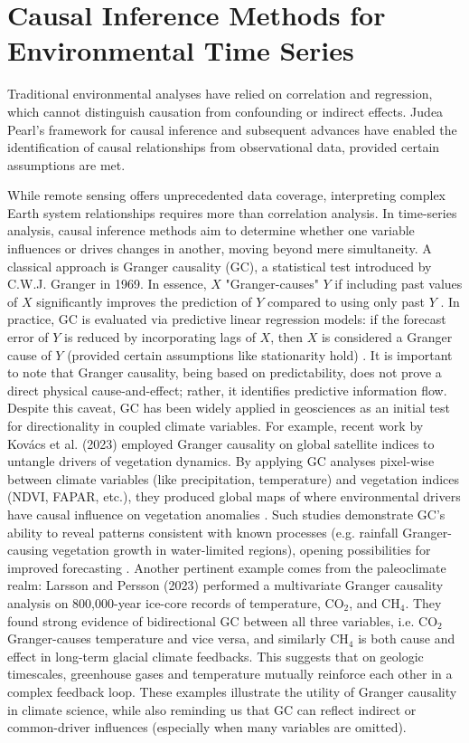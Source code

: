 
\section{Causal Inference Methods for Environmental Time Series}

Traditional environmental analyses have relied on correlation and regression, which cannot distinguish causation from confounding or indirect effects. Judea Pearl's framework for causal inference \cite{Pearl2009} and subsequent advances have enabled the identification of causal relationships from observational data, provided certain assumptions are met.

While remote sensing offers unprecedented data coverage, interpreting complex Earth system relationships requires more than correlation analysis. In time-series analysis, causal inference methods aim to determine whether one variable influences or drives changes in another, moving beyond mere simultaneity. A classical approach is Granger causality (GC), a statistical test introduced by C.W.J. Granger in 1969. In essence, $X$ "Granger-causes" $Y$ if including past values of $X$ significantly improves the prediction of $Y$ compared to using only past $Y$ \cite{Kovacs2023}. In practice, GC is evaluated via predictive linear regression models: if the forecast error of $Y$ is reduced by incorporating lags of $X$, then $X$ is considered a Granger cause of $Y$ (provided certain assumptions like stationarity hold)
\cite{Kovacs2023}. It is important to note that Granger causality, being based on predictability, does not prove a direct physical cause-and-effect; rather, it identifies predictive information flow. Despite this caveat, GC has been widely applied in geosciences as an initial test for directionality in coupled climate variables. For example, recent work by Kovács et al. (2023) \cite{Kovacs2023} employed Granger causality on global satellite indices to untangle drivers of vegetation dynamics. By applying GC analyses pixel-wise between climate variables (like precipitation, temperature) and vegetation indices (NDVI, FAPAR, etc.), they produced global maps of where environmental drivers have causal influence on vegetation anomalies \cite{Kovacs2023}. Such studies demonstrate GC's ability to reveal patterns consistent with known processes (e.g. rainfall Granger-causing vegetation growth in water-limited regions), opening possibilities for improved forecasting \cite{Kovacs2023}. Another pertinent example comes from the paleoclimate realm: Larsson and Persson (2023) \cite{Larsson2023} performed a multivariate Granger causality analysis on 800,000-year ice-core records of temperature, CO$_2$, and CH$_4$. They found strong evidence of bidirectional GC between all three variables, i.e. CO$_2$ Granger-causes temperature and vice versa, and similarly CH$_4$ is both cause and effect in long-term glacial climate feedbacks. This suggests that on geologic timescales, greenhouse gases and temperature mutually reinforce each other in a complex feedback loop. These examples illustrate the utility of Granger causality in climate science, while also reminding us that GC can reflect indirect or common-driver influences (especially when many variables are omitted).

